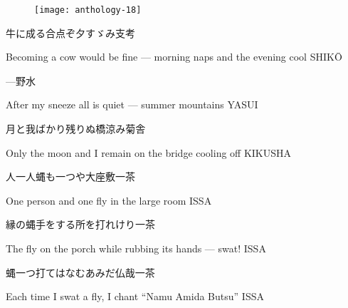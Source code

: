\begin{figure}
    \texttt{[image: anthology-18]}
\end{figure}

\begin{haiku}
    {\FH 牛に成る合点ぞ夕すゞみ}\hfill{\FH 支考}

    \vin{} Becoming a cow
    \vin{} \vin{} would be fine --- morning naps
    \vin{} \vin{} \vin{} and the evening cool \hspace{\fill} SHIK\={O}
\end{haiku}

\begin{haiku}
    {---}\hfill{\FH 野水}

    \vin{} After my sneeze
    \vin{} \vin{} all is quiet ---
    \vin{} \vin{} \vin{} summer mountains \hspace{\fill} YASUI
\end{haiku}

\begin{haiku}
    {\FH 月と我ばかり残りぬ橋涼み}\hfill{\FH 菊舎}

    \vin{} Only the moon and I
    \vin{} \vin{} remain on the bridge
    \vin{} \vin{} \vin{} cooling off \hspace{\fill} KIKUSHA
\end{haiku}

\begin{haiku}
    {\FH 人一人蝿も一つや大座敷}\hfill{\FH 一茶}

    \vin{} One person
    \vin{} \vin{} and one fly
    \vin{} \vin{} \vin{} in the large room \hspace{\fill} ISSA
\end{haiku}

\begin{haiku}
    {\FH 縁の蝿手をする所を打れけり}\hfill{\FH 一茶}

    \vin{} The fly on the porch
    \vin{} \vin{} while rubbing its hands ---
    \vin{} \vin{} \vin{} swat! \hspace{\fill} ISSA
\end{haiku}

\begin{haiku}
    {\FH 蝿一つ打てはなむあみだ仏哉}\hfill{\FH 一茶}

    \vin{} Each time
    \vin{} \vin{} I swat a fly, I chant
    \vin{} \vin{} \vin{} ``Namu Amida Butsu'' \hspace{\fill} ISSA
\end{haiku}

